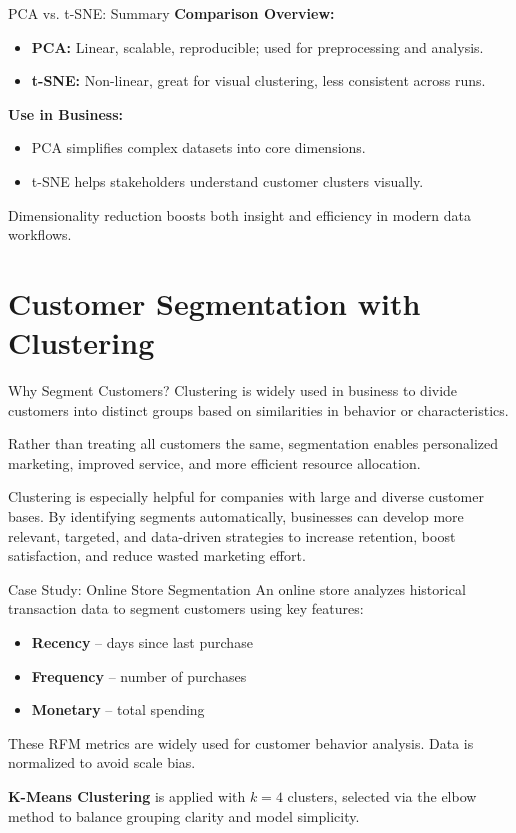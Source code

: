 \documentclass[aspectratio=169, table]{beamer}
\begin{document}
\begin{frame}{PCA vs. t-SNE: Summary}
	\textbf{Comparison Overview:}
	\begin{itemize}
		\item \textbf{PCA:} Linear, scalable, reproducible; used for preprocessing and analysis.
		\item \textbf{t-SNE:} Non-linear, great for visual clustering, less consistent across runs.
	\end{itemize}
	
	\textbf{Use in Business:}
	\begin{itemize}
		\item PCA simplifies complex datasets into core dimensions.
		\item t-SNE helps stakeholders understand customer clusters visually.
	\end{itemize}
	
	Dimensionality reduction boosts both insight and efficiency in modern data workflows.
\end{frame}

\section{Customer Segmentation with Clustering}

\begin{frame}{Why Segment Customers?}
	Clustering is widely used in business to divide customers into distinct groups based on similarities in behavior or characteristics. 
	
	Rather than treating all customers the same, segmentation enables personalized marketing, improved service, and more efficient resource allocation. 
	
	Clustering is especially helpful for companies with large and diverse customer bases. By identifying segments automatically, businesses can develop more relevant, targeted, and data-driven strategies to increase retention, boost satisfaction, and reduce wasted marketing effort.
\end{frame}

\begin{frame}{Case Study: Online Store Segmentation}
	An online store analyzes historical transaction data to segment customers using key features:
	
	\begin{itemize}
		\item \textbf{Recency} – days since last purchase
		\item \textbf{Frequency} – number of purchases
		\item \textbf{Monetary} – total spending
	\end{itemize}
	
	These RFM metrics are widely used for customer behavior analysis. Data is normalized to avoid scale bias. 
	
	\textbf{K-Means Clustering} is applied with \(k = 4\) clusters, selected via the elbow method to balance grouping clarity and model simplicity.
\end{frame}
\end{document}
